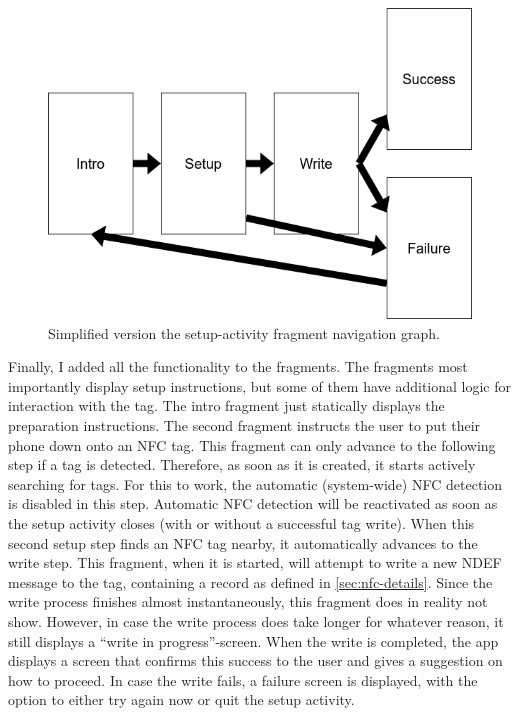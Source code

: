 \documentclass[conference]{IEEEtran}
\begin{document}
\begin{figure}
	\centering
	\includegraphics[width=\linewidth]{nav-graph.drawio.png}
	\caption{Simplified version the setup-activity fragment navigation graph.}
	\label{fig:nav-graph}
\end{figure}

Finally, I added all the functionality to the fragments. The fragments most importantly display setup instructions, but some of them have additional logic for interaction with the tag. The intro fragment just statically displays the preparation instructions. The second fragment instructs the user to put their phone down onto an NFC tag. This fragment can only advance to the following step if a tag is detected. Therefore, as soon as it is created, it starts actively searching for tags. For this to work, the automatic (system-wide) NFC detection is disabled in this step. Automatic NFC detection will be reactivated as soon as the setup activity closes (with or without a successful tag write). When this second setup step finds an NFC tag nearby, it automatically advances to the write step. This fragment, when it is started, will attempt to write a new NDEF message to the tag, containing a record as defined in \cref{sec:nfc-details}. Since the write process finishes almost instantaneously, this fragment does in reality not show. However, in case the write process does take longer for whatever reason, it still displays a ``write in progress''-screen. When the write is completed, the app displays a screen that confirms this success to the user and gives a suggestion on how to proceed. In case the write fails, a failure screen is displayed, with the option to either try again now or quit the setup activity.
\end{document}
